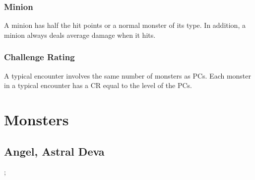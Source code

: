 \subsubsection{Minion}
A minion has half the hit points or a normal monster of its type. In addition, a minion always deals average damage when it hits.

\subsubsection{Challenge Rating}

A typical encounter involves the same number of monsters as PCs. Each monster in a typical encounter has a CR equal to the level of the PCs.

\section{Monsters}

\begin{comment}

\subsection{Example}
\montypes{Align}{Size}{type}{CR}{Archetypes}
\msenses{Init}{\plus Perception}
\monspace{Space}{Reach}; \monspeed{Speed ft.}%
\monlanguages{Languages}

\monlinerule 

\monac{Normal}{Touch}{Flat}{CMD}{modifiers}
\monhp{HP}{HV}
\monsaves{Fort}{Ref}{Will}

\monlinerule

\monmelee{Melee}
\moncmb{BAB}{CMB}

\monlinerule 

\monattributes{}{}{}{}{}{}
\monfeats{Feats}
\monskills{Skills}

\monlinerule

\monability{Name}{Effect}

\mondescription{Example}

\monbehavior{Example}

\end{comment}
\subsection{Angel, Astral Deva}
; %

